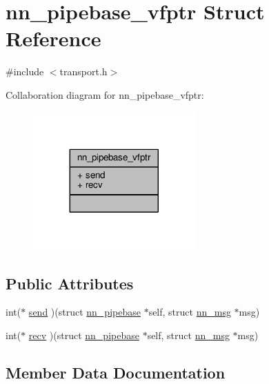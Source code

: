 \hypertarget{structnn__pipebase__vfptr}{}\section{nn\+\_\+pipebase\+\_\+vfptr Struct Reference}
\label{structnn__pipebase__vfptr}


{\ttfamily \#include $<$transport.\+h$>$}



Collaboration diagram for nn\+\_\+pipebase\+\_\+vfptr\+:\nopagebreak
\begin{figure}[H]
\begin{center}
\leavevmode
\includegraphics[width=176pt]{structnn__pipebase__vfptr__coll__graph}
\end{center}
\end{figure}
\subsection*{Public Attributes}
\begin{DoxyCompactItemize}
\item 
int($\ast$ \hyperlink{structnn__pipebase__vfptr_af11809ca13dbddb6d8640d701aa284b8}{send} )(struct \hyperlink{structnn__pipebase}{nn\+\_\+pipebase} $\ast$self, struct \hyperlink{structnn__msg}{nn\+\_\+msg} $\ast$msg)
\item 
int($\ast$ \hyperlink{structnn__pipebase__vfptr_a0e5133204ccaf510ef71b89ea3083c45}{recv} )(struct \hyperlink{structnn__pipebase}{nn\+\_\+pipebase} $\ast$self, struct \hyperlink{structnn__msg}{nn\+\_\+msg} $\ast$msg)
\end{DoxyCompactItemize}


\subsection{Member Data Documentation}
